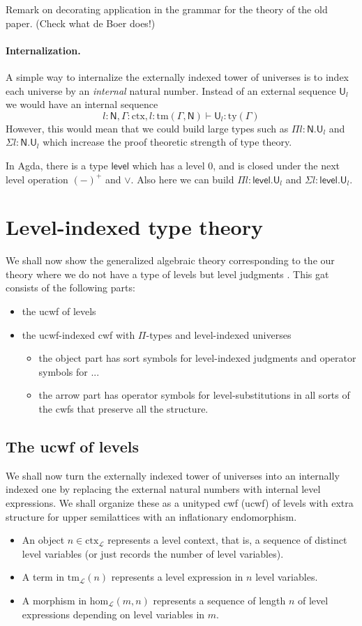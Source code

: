 \documentclass[11pt,a4paper]{article}
\theoremstyle{definition}
\newcommand{\UU}{\mathsf{U}}
\newcommand{\Level}{\mathsf{level}}
\newcommand{\Ctx}{\mathrm{Ctx}}
\newcommand{\Tm}{\mathrm{Tm}}
\def\UU{\mathsf{U}}
\newcommand{\N}{\mathsf{N}}
\def\Ctx{\mathrm{ctx}}
\def\Tm{\mathrm{tm}}
\def\Hom{\mathrm{hom}}
\newcommand{\ctx}{\mathrm{ctx}}
\newcommand{\ty}{\mathrm{ty}}
\newcommand{\tm}{\mathrm{tm}}
\def\U{\mathsf{U}}
\def\L{{\mathcal{L}}}
\begin{document}
Remark on decorating application in the grammar for the theory of the old paper. (Check what de Boer does!)

\paragraph{Internalization.}
A simple way to internalize the externally indexed tower of universes is to index each universe by an {\em internal} natural number. Instead of an external sequence $\UU_l$ we would have an internal sequence 
$$l : \N, \Gamma : \ctx, l : \tm(\Gamma,\N) \vdash \UU_l : \ty(\Gamma)$$
However, this would mean that we could build large types such as $\Pi l : \N.\U_l$ and $\Sigma l : \N.\U_l$ which increase the proof theoretic strength of type theory. 

In Agda, there is a type $\Level$ which has a level 0, and is closed under the next level operation $(-)^+$ and $\vee$. Also here we can build $\Pi l : \Level.\U_l$ and $\Sigma l : \Level.\U_l$.

\section{Level-indexed type theory}

We shall now show the generalized algebraic theory corresponding to the our theory where we do not have a type of levels but level judgments \cite{BezemCDE22}.
This gat consists of the following parts:
\begin{itemize}
\item the ucwf of levels
\item the ucwf-indexed cwf with $\Pi$-types and level-indexed universes
\begin{itemize}
\item the object part has sort symbols for level-indexed judgments and operator symbols for ...
\item the arrow part has operator symbols for level-substitutions in all sorts of the cwfs that preserve all the structure.
\end{itemize}
\end{itemize}

\subsection{The ucwf of levels}
We shall now turn the externally indexed tower of universes into an internally indexed one by replacing the external natural numbers with internal level expressions. We shall organize these as a unityped cwf (ucwf) of levels  with extra structure for upper semilattices with an inflationary endomorphism. 
\begin{itemize}
\item 
An object $n \in \Ctx_\L$ represents a level context, that is, a sequence of distinct level variables (or just records the number of level variables). 
\item
A term in $\Tm_\L(n)$ represents a level expression in $n$ level variables.
\item
A morphism in $\Hom_\L(m,n)$ represents a sequence of length $n$ of level expressions depending on level variables in $m$.
\end{itemize}
\end{document}
